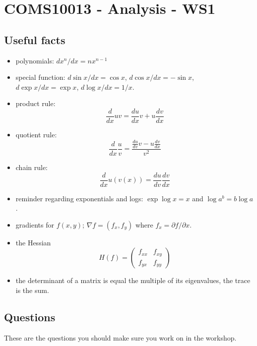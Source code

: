 \documentclass[11pt,a4paper]{scrartcl}
\begin{document}
\section*{COMS10013 - Analysis - WS1}

\subsection*{Useful facts}

\begin{itemize}

\item polynomials: $dx^n/dx=nx^{n-1}$
\item special function: $d\sin{x}/dx=\cos{x}$, $d\cos{x}/dx=-\sin{x}$, $d\exp{x}/dx=\exp{x}$, $d\log{x}/dx=1/x$.
\item product rule:
$$\frac{d}{dx}uv = \frac{du}{dx}v+u\frac{dv}{dx}$$
\item quotient rule:
$$\frac{d}{dx}\frac{u}{v}=\frac{\frac{du}{dv}v-u\frac{dv}{dx}}{v^2}$$
\item chain rule:
$$\frac{d}{dx}u(v(x))=\frac{du}{dv}\frac{dv}{dx}$$
\item reminder regarding exponentials and logs: $\exp{\log{x}}=x$ and $\log{a^b}=b\log{a}$.
\item gradients for $f(x,y)$; $\nabla{f}=(f_x,f_y)$ where $f_x=\partial f/\partial x$.
\item the Hessian
$$H(f)=\left(\begin{array}{cc}f_{xx}&f_{xy}\\f_{yx}&f_{yy}\end{array}\right)$$
\item the determinant of a matrix is equal the multiple of its eigenvalues, the trace is the sum.

\end{itemize}

\subsection*{Questions}

These are the questions you should make sure you work on in the workshop.
\end{document}
